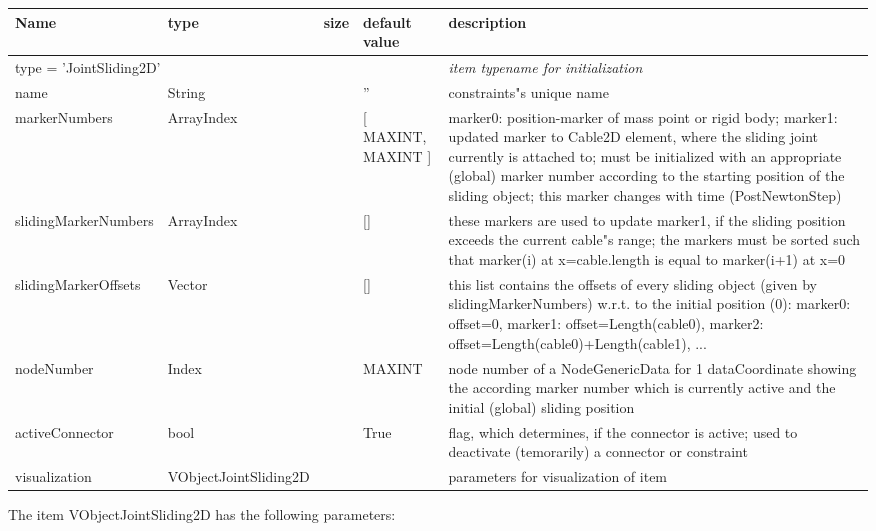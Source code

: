 \begin{center}
  \footnotesize
  \begin{longtable}{| p{4.5cm} | p{2.5cm} | p{0.5cm} | p{2.5cm} | p{6cm} |}
    \hline
    \bf Name & \bf type & \bf size & \bf default value & \bf description \\ \hline
    \multicolumn{4}{l}{\parbox{10cm}{type = 'JointSliding2D'}} & \multicolumn{1}{l}{\parbox{6cm}{\it item typename for initialization}}\\ \hline
    name &     String &      &     '' &     constraints"s unique name\\ \hline
    markerNumbers &     ArrayIndex &      &     [ MAXINT, MAXINT ] &     marker0: position-marker of mass point or rigid body; marker1: updated marker to Cable2D element, where the sliding joint currently is attached to; must be initialized with an appropriate (global) marker number according to the starting position of the sliding object; this marker changes with time (PostNewtonStep)\\ \hline
    slidingMarkerNumbers &     ArrayIndex &      &     [] &     these markers are used to update marker1, if the sliding position exceeds the current cable"s range; the markers must be sorted such that marker(i) at x=cable.length is equal to marker(i+1) at x=0\\ \hline
    slidingMarkerOffsets &     Vector &      &     [] &     this list contains the offsets of every sliding object (given by slidingMarkerNumbers) w.r.t. to the initial position (0): marker0: offset=0, marker1: offset=Length(cable0), marker2: offset=Length(cable0)+Length(cable1), ...\\ \hline
    nodeNumber &     Index &      &     MAXINT &     node number of a NodeGenericData for 1 dataCoordinate showing the according marker number which is currently active and the initial (global) sliding position\\ \hline
    activeConnector &     bool &      &     True &     flag, which determines, if the connector is active; used to deactivate (temorarily) a connector or constraint\\ \hline
    visualization & VObjectJointSliding2D & & & parameters for visualization of item \\ \hline
	  \end{longtable}
	\end{center}
The item VObjectJointSliding2D has the following parameters:
